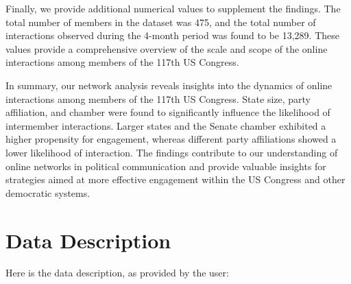 \documentclass[11pt]{article}
\begin{document}
Finally, we provide additional numerical values to supplement the findings. The total number of members in the dataset was 475, and the total number of interactions observed during the 4-month period was found to be 13,289. These values provide a comprehensive overview of the scale and scope of the online interactions among members of the 117th US Congress.

In summary, our network analysis reveals insights into the dynamics of online interactions among members of the 117th US Congress. State size, party affiliation, and chamber were found to significantly influence the likelihood of intermember interactions. Larger states and the Senate chamber exhibited a higher propensity for engagement, whereas different party affiliations showed a lower likelihood of interaction. The findings contribute to our understanding of online networks in political communication and provide valuable insights for strategies aimed at more effective engagement within the US Congress and other democratic systems.


\clearpage
\appendix

\section{Data Description} \label{sec:data_description} Here is the data description, as provided by the user:
\end{document}
